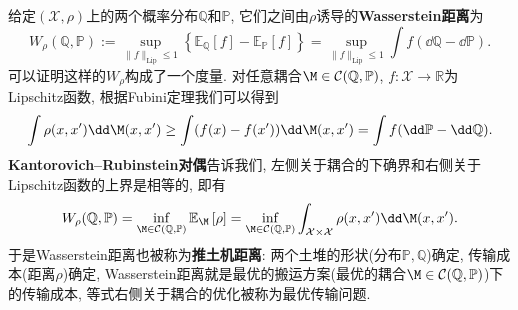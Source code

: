 给定$(\mathcal{X}, \rho)$上的两个概率分布$\mathbb{Q}$和$\mathbb{P}$, 它们之间由$\rho$诱导的\textbf{Wasserstein距离}为
\begin{equation*}
	W_{\rho}(\mathbb{Q}, \mathbb{P}) 
	:= \sup_{\|f\|_{\text{Lip}} \leq 1} \left\{ \mathbb{E}_{\mathbb{Q}} [f] - \mathbb{E}_{\mathbb{P}} [f] \right\}
	= \sup_{\|f\|_{\text{Lip}} \leq 1} \int f (\dd \mathbb{Q} - \dd \mathbb{P}). 
\end{equation*}
可以证明这样的$W_{\rho}$构成了一个度量. 
对任意耦合$\M \in \mathcal{C}(\mathbb{Q}, \mathbb{P})$, $f \colon \mathcal{X} \to \mathbb{R}$为Lipschitz函数, 根据Fubini定理我们可以得到
\begin{equation*}
	\int \rho(x, x') \dd \M(x, x')
	\geq \int (f(x) - f(x')) \dd \M(x, x')
	= \int f(\dd \mathbb{P} - \dd \mathbb{Q}). 
\end{equation*}
\textbf{Kantorovich–Rubinstein对偶}告诉我们, 左侧关于耦合的下确界和右侧关于Lipschitz函数的上界是相等的, 即有
\begin{equation*}
	W_{\rho}(\mathbb{Q}, \mathbb{P})
	= \inf_{\M \in \mathcal{C}(\mathbb{Q}, \mathbb{P})} \mathbb{E}_{\M} \left[ \rho \right]
	= \inf_{\M \in \mathcal{C}(\mathbb{Q}, \mathbb{P})} \int_{\mathcal{X} \times \mathcal{X}} \rho(x, x') \dd \M(x, x'). 
\end{equation*}
于是Wasserstein距离也被称为\textbf{推土机距离}: 两个土堆的形状(分布$\mathbb{P}, \mathbb{Q}$)确定, 传输成本(距离$\rho$)确定, Wasserstein距离就是最优的搬运方案(最优的耦合$\M \in \mathcal{C}(\mathbb{Q}, \mathbb{P})$)下的传输成本, 等式右侧关于耦合的优化被称为最优传输问题. 

